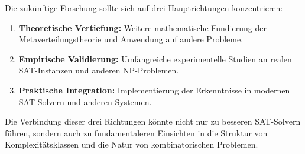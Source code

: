﻿\documentclass[a4paper,12pt]{article}
\theoremstyle{definition}
\begin{document}
Die zukünftige Forschung sollte sich auf drei Hauptrichtungen konzentrieren:
\begin{enumerate}
	\item \textbf{Theoretische Vertiefung:} Weitere mathematische Fundierung der Metaverteilungstheorie und Anwendung auf andere Probleme.
	\item \textbf{Empirische Validierung:} Umfangreiche experimentelle Studien an realen SAT-Instanzen und anderen NP-Problemen.
	\item \textbf{Praktische Integration:} Implementierung der Erkenntnisse in modernen SAT-Solvern und anderen Systemen.
\end{enumerate}

Die Verbindung dieser drei Richtungen könnte nicht nur zu besseren SAT-Solvern führen, sondern auch zu fundamentaleren Einsichten in die Struktur von Komplexitätsklassen und die Natur von kombinatorischen Problemen.
\end{document}
